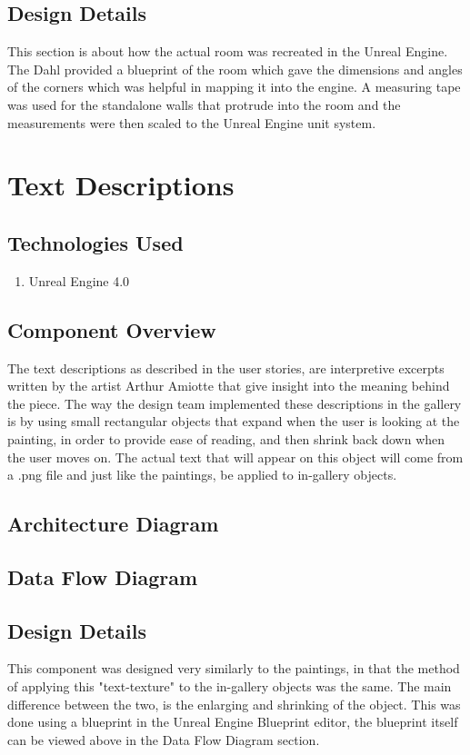 \subsection{Design Details}
This section is about how the actual room was recreated in the Unreal Engine.  The Dahl provided a blueprint of the room which gave the dimensions and angles of the corners which was helpful in mapping it into the engine.  A measuring tape was used for the standalone walls that protrude into the room and the measurements were then scaled to the Unreal Engine unit system.

\section{Text Descriptions}

\subsection{Technologies Used}
	\begin{enumerate}
		\item Unreal Engine 4.0
	\end{enumerate}

\subsection{Component Overview}
The text descriptions as described in the user stories, are interpretive excerpts written by the artist Arthur Amiotte that give insight into the meaning behind the piece.  The way the design team implemented these descriptions in the gallery is by using small rectangular objects that expand when the user is looking at the painting, in order to provide ease of reading, and then shrink back down when the user moves on.  The actual text that will appear on this object will come from a .png file and just like the paintings, be applied to in-gallery objects. 

\subsection{Architecture Diagram}
\subsection{Data Flow Diagram}

\subsection{Design Details}
This component was designed very similarly to the paintings, in that the method of applying this "text-texture" to the in-gallery objects was the same.  The main difference between the two, is the enlarging and shrinking of the object.  This was done using a blueprint in the Unreal Engine Blueprint editor, the blueprint itself can be viewed above in the Data Flow Diagram section.  


